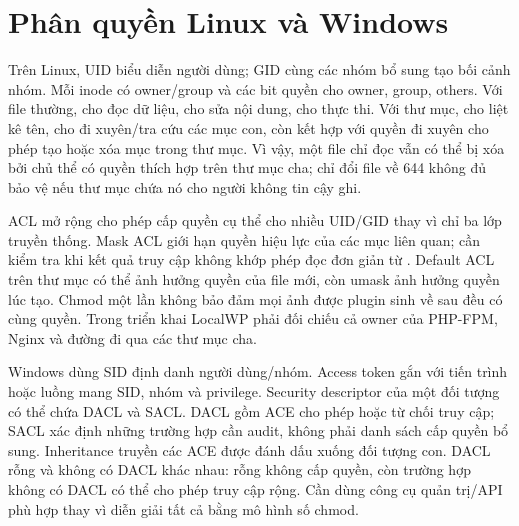 \section{Phân quyền Linux và Windows}
Trên Linux, UID biểu diễn người dùng; GID cùng các nhóm bổ sung tạo bối cảnh nhóm. Mỗi inode có owner/group và các bit quyền cho owner, group, others. Với file thường,  cho đọc dữ liệu,  cho sửa nội dung,  cho thực thi. Với thư mục,  cho liệt kê tên,  cho đi xuyên/tra cứu các mục con, còn  kết hợp với quyền đi xuyên cho phép tạo hoặc xóa mục trong thư mục. Vì vậy, một file chỉ đọc vẫn có thể bị xóa bởi chủ thể có quyền thích hợp trên thư mục cha; chỉ đổi file về 644 không đủ bảo vệ nếu thư mục chứa nó cho người không tin cậy ghi.

ACL mở rộng cho phép cấp quyền cụ thể cho nhiều UID/GID thay vì chỉ ba lớp truyền thống. Mask ACL giới hạn quyền hiệu lực của các mục liên quan; cần kiểm tra  khi kết quả truy cập không khớp phép đọc đơn giản từ . Default ACL trên thư mục có thể ảnh hưởng quyền của file mới, còn umask ảnh hưởng quyền lúc tạo. Chmod một lần không bảo đảm mọi ảnh được plugin sinh về sau đều có cùng quyền. Trong triển khai LocalWP phải đối chiếu cả owner của PHP-FPM, Nginx và đường đi qua các thư mục cha.\cite{linuxAcl}

Windows dùng SID định danh người dùng/nhóm. Access token gắn với tiến trình hoặc luồng mang SID, nhóm và privilege. Security descriptor của một đối tượng có thể chứa DACL và SACL. DACL gồm ACE cho phép hoặc từ chối truy cập; SACL xác định những trường hợp cần audit, không phải danh sách cấp quyền bổ sung. Inheritance truyền các ACE được đánh dấu xuống đối tượng con. DACL rỗng và không có DACL khác nhau: rỗng không cấp quyền, còn trường hợp không có DACL có thể cho phép truy cập rộng. Cần dùng công cụ quản trị/API phù hợp thay vì diễn giải tất cả bằng mô hình số chmod.\cite{windowsTokens,windowsAcl}

